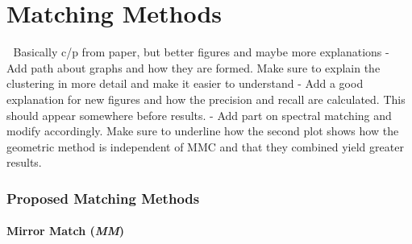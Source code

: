 \chapter{Matching Methods}
Basically c/p from paper, but better figures and maybe more explanations
 - Add path about graphs and how they are formed. Make sure to explain 
 the clustering in more detail and make it easier to understand
 - Add a good explanation for new figures and how the precision and 
 recall are calculated. This should appear somewhere before results.
 - Add part on spectral matching and modify accordingly. Make sure to 
 underline how the second plot shows how the geometric method is 
 independent of MMC and that they combined yield greater results.

\subsection{Proposed Matching Methods}
\label{S:MatchingMethods}

\subsubsection{Mirror Match (\emph{MM})}

